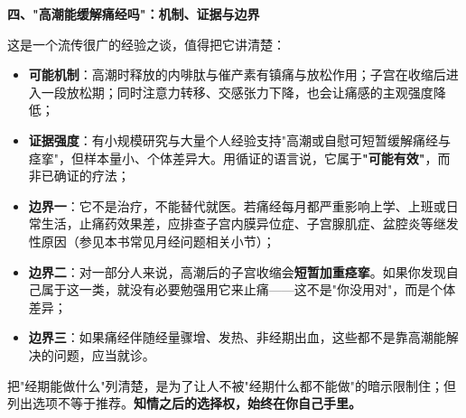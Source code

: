 \textbf{四、"高潮能缓解痛经吗"：机制、证据与边界}

这是一个流传很广的经验之谈，值得把它讲清楚：

\begin{itemize}
\item \textbf{可能机制}：高潮时释放的内啡肽与催产素有镇痛与放松作用；子宫在收缩后进入一段放松期；同时注意力转移、交感张力下降，也会让痛感的主观强度降低；
\item \textbf{证据强度}：有小规模研究与大量个人经验支持"高潮或自慰可短暂缓解痛经与痉挛"，但样本量小、个体差异大。用循证的语言说，它属于\textbf{"可能有效"}，而非已确证的疗法；
\item \textbf{边界一}：它不是治疗，不能替代就医。若痛经每月都严重影响上学、上班或日常生活，止痛药效果差，应排查子宫内膜异位症、子宫腺肌症、盆腔炎等继发性原因（参见本书常见月经问题相关小节）；
\item \textbf{边界二}：对一部分人来说，高潮后的子宫收缩会\textbf{短暂加重痉挛}。如果你发现自己属于这一类，就没有必要勉强用它来止痛——这不是"你没用对"，而是个体差异；
\item \textbf{边界三}：如果痛经伴随经量骤增、发热、非经期出血，这些都不是靠高潮能解决的问题，应当就诊。
\end{itemize}

\begin{tcolorbox}[colback=pink!5!white,colframe=red!50!black,title=贴心小叮咛]
把"经期能做什么"列清楚，是为了让人不被"经期什么都不能做"的暗示限制住；但列出选项不等于推荐。\textbf{知情之后的选择权，始终在你自己手里。}
\end{tcolorbox}

